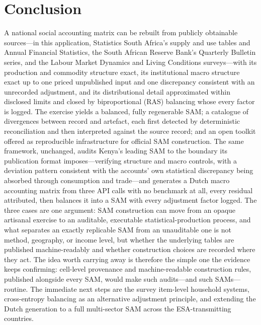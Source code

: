 \section{Conclusion}\label{sec:conclusion}

A national social accounting matrix can be rebuilt from publicly
obtainable sources---in
this application, Statistics South Africa's supply and use tables and
Annual Financial Statistics, the South African Reserve Bank's Quarterly
Bulletin series, and the Labour Market Dynamics and Living Conditions
surveys---with its production and commodity structure exact, its
institutional macro structure exact up to one priced unpublished input and
one discrepancy consistent with an unrecorded adjustment, and its
distributional detail
approximated within disclosed limits and closed by biproportional (RAS)
balancing whose every factor is logged. The exercise yields a balanced,
fully regenerable SAM; a catalogue of divergences between record and
artefact, each first detected by deterministic reconciliation and then
interpreted against the source record; and an open toolkit offered as
reproducible infrastructure for official SAM construction. The same
framework, unchanged, audits Kenya's leading SAM to the boundary its
publication format imposes---verifying structure and macro controls, with
a deviation pattern consistent with the accounts' own statistical
discrepancy being absorbed through consumption and trade---and generates
a Dutch macro accounting matrix from three API calls with no benchmark at
all, every residual attributed, then balances it into a SAM with every
adjustment factor logged. The three cases are one argument: SAM
construction can move from an opaque artisanal exercise to an auditable,
executable statistical-production process, and what separates an exactly
replicable SAM from an unauditable one is not method, geography, or
income level, but whether the underlying tables are published
machine-readably and whether construction choices are recorded where they
act. The idea worth carrying away is therefore the
simple one the evidence keeps confirming: cell-level provenance and
machine-readable construction rules, published alongside every SAM, would
make such audits---and such SAMs---routine. The immediate next steps are
the survey item-level household systems, cross-entropy balancing as an
alternative adjustment principle, and extending the Dutch generation to a
full multi-sector SAM across the ESA-transmitting countries.
